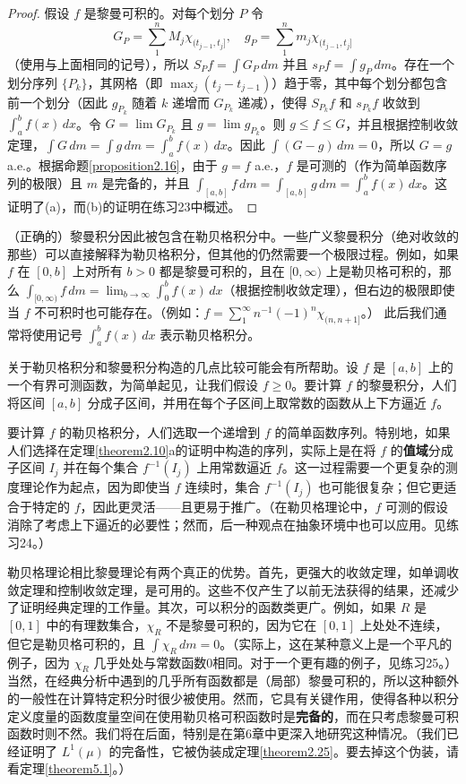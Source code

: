 \documentclass[lang=cn,10pt,thmcnt=section]{elegantbook}
\begin{document}
\begin{proof}
假设 $f$ 是黎曼可积的。对每个划分 $P$ 令
\[ G_P = \sum_1^n M_j \chi_{(t_{j-1}, t_j]}, \quad g_P = \sum_1^n m_j \chi_{(t_{j-1}, t_j]} \]
（使用与上面相同的记号），所以 $S_P f = \int G_P \,dm$ 并且 $s_P f = \int g_P \,dm$。存在一个划分序列 $\{P_k\}$，其网格（即 $\max_j(t_j-t_{j-1})$）趋于零，其中每个划分都包含前一个划分（因此 $g_{P_k}$ 随着 $k$ 递增而 $G_{P_k}$ 递减），使得 $S_{P_k} f$ 和 $s_{P_k} f$ 收敛到 $\int_a^b f(x)\,dx$。令 $G = \lim G_{P_k}$ 且 $g = \lim g_{P_k}$。则 $g \le f \le G$，并且根据控制收敛定理，$\int G \,dm = \int g \,dm = \int_a^b f(x)\,dx$。因此 $\int(G-g)\,dm = 0$，所以 $G=g$ a.e.。根据命题\ref{proposition2.16}，由于 $g=f$ a.e.，$f$ 是可测的（作为简单函数序列的极限）且 $m$ 是完备的，并且 $\int_{[a,b]} f\,dm = \int_{[a,b]} g\,dm = \int_a^b f(x)\,dx$。这证明了(a)，而(b)的证明在练习23中概述。
\end{proof}

（正确的）黎曼积分因此被包含在勒贝格积分中。一些广义黎曼积分（绝对收敛的那些）可以直接解释为勒贝格积分，但其他的仍然需要一个极限过程。例如，如果 $f$ 在 $[0,b]$ 上对所有 $b > 0$ 都是黎曼可积的，且在 $[0, \infty)$ 上是勒贝格可积的，那么 $\int_{[0,\infty)} f \,dm = \lim_{b\to\infty} \int_0^b f(x) \,dx$（根据控制收敛定理），但右边的极限即使当 $f$ 不可积时也可能存在。（例如：$f = \sum_1^{\infty} n^{-1}(-1)^n \chi_{(n,n+1]}$。） 此后我们通常将使用记号 $\int_a^b f(x) \,dx$ 表示勒贝格积分。

关于勒贝格积分和黎曼积分构造的几点比较可能会有所帮助。设 $f$ 是 $[a,b]$ 上的一个有界可测函数，为简单起见，让我们假设 $f \geq 0$。要计算 $f$ 的黎曼积分，人们将区间 $[a,b]$ 分成子区间，并用在每个子区间上取常数的函数从上下方逼近 $f$。

要计算 $f$ 的勒贝格积分，人们选取一个递增到 $f$ 的简单函数序列。特别地，如果人们选择在定理\ref{theorem2.10}a的证明中构造的序列，实际上是在将 $f$ 的\textbf{值域}分成子区间 $I_j$ 并在每个集合 $f^{-1}(I_j)$ 上用常数逼近 $f$。这一过程需要一个更复杂的测度理论作为起点，因为即使当 $f$ 连续时，集合 $f^{-1}(I_j)$ 也可能很复杂；但它更适合于特定的 $f$，因此更灵活——且更易于推广。（在勒贝格理论中，$f$ 可测的假设消除了考虑上下逼近的必要性；然而，后一种观点在抽象环境中也可以应用。见练习24。）

勒贝格理论相比黎曼理论有两个真正的优势。首先，更强大的收敛定理，如单调收敛定理和控制收敛定理，是可用的。这些不仅产生了以前无法获得的结果，还减少了证明经典定理的工作量。其次，可以积分的函数类更广。例如，如果 $R$ 是 $[0,1]$ 中的有理数集合，$\chi_R$ 不是黎曼可积的，因为它在 $[0,1]$ 上处处不连续，但它是勒贝格可积的，且 $\int \chi_R \,dm = 0$。（实际上，这在某种意义上是一个平凡的例子，因为 $\chi_R$ 几乎处处与常数函数0相同。对于一个更有趣的例子，见练习25。）当然，在经典分析中遇到的几乎所有函数都是（局部）黎曼可积的，所以这种额外的一般性在计算特定积分时很少被使用。然而，它具有关键作用，使得各种以积分定义度量的函数度量空间在使用勒贝格可积函数时是\textbf{完备的}，而在只考虑黎曼可积函数时则不然。我们将在后面，特别是在第6章中更深入地研究这种情况。（我们已经证明了 $L^1(\mu)$ 的完备性，它被伪装成定理\ref{theorem2.25}。要去掉这个伪装，请看定理\ref{theorem5.1}。）
\end{document}
